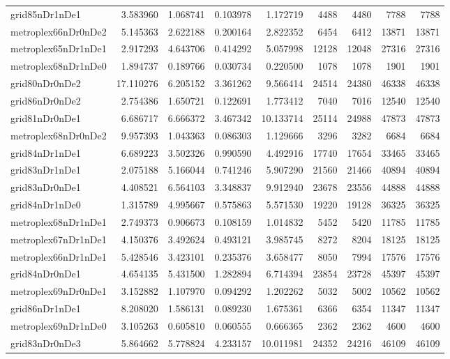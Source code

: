 \begin{longtable}{|l|r|r|r|r|r|r|r|r|}
grid85nDr1nDe1 & 3.583960 & 1.068741 & 0.103978 & 1.172719 & 4488 & 4480 & 7788 & 7788 \\
metroplex66nDr0nDe2 & 5.145363 & 2.622188 & 0.200164 & 2.822352 & 6454 & 6412 & 13871 & 13871 \\
metroplex65nDr1nDe1 & 2.917293 & 4.643706 & 0.414292 & 5.057998 & 12128 & 12048 & 27316 & 27316 \\
metroplex68nDr1nDe0 & 1.894737 & 0.189766 & 0.030734 & 0.220500 & 1078 & 1078 & 1901 & 1901 \\
grid80nDr0nDe2 & 17.110276 & 6.205152 & 3.361262 & 9.566414 & 24514 & 24380 & 46338 & 46338 \\
grid86nDr0nDe2 & 2.754386 & 1.650721 & 0.122691 & 1.773412 & 7040 & 7016 & 12540 & 12540 \\
grid81nDr0nDe1 & 6.686717 & 6.666372 & 3.467342 & 10.133714 & 25114 & 24988 & 47873 & 47873 \\
metroplex68nDr0nDe2 & 9.957393 & 1.043363 & 0.086303 & 1.129666 & 3296 & 3282 & 6684 & 6684 \\
grid84nDr1nDe1 & 6.689223 & 3.502326 & 0.990590 & 4.492916 & 17740 & 17654 & 33465 & 33465 \\
grid83nDr1nDe1 & 2.075188 & 5.166044 & 0.741246 & 5.907290 & 21560 & 21466 & 40894 & 40894 \\
grid83nDr0nDe1 & 4.408521 & 6.564103 & 3.348837 & 9.912940 & 23678 & 23556 & 44888 & 44888 \\
grid84nDr1nDe0 & 1.315789 & 4.995667 & 0.575863 & 5.571530 & 19220 & 19128 & 36325 & 36325 \\
metroplex68nDr1nDe1 & 2.749373 & 0.906673 & 0.108159 & 1.014832 & 5452 & 5420 & 11785 & 11785 \\
metroplex67nDr1nDe1 & 4.150376 & 3.492624 & 0.493121 & 3.985745 & 8272 & 8204 & 18125 & 18125 \\
metroplex66nDr1nDe1 & 5.428546 & 3.423101 & 0.235376 & 3.658477 & 8050 & 7994 & 17576 & 17576 \\
grid84nDr0nDe1 & 4.654135 & 5.431500 & 1.282894 & 6.714394 & 23854 & 23728 & 45397 & 45397 \\
metroplex69nDr0nDe1 & 3.152882 & 1.107970 & 0.094292 & 1.202262 & 5032 & 5002 & 10562 & 10562 \\
grid86nDr1nDe1 & 8.208020 & 1.586131 & 0.089230 & 1.675361 & 6366 & 6354 & 11347 & 11347 \\
metroplex69nDr1nDe0 & 3.105263 & 0.605810 & 0.060555 & 0.666365 & 2362 & 2362 & 4600 & 4600 \\
grid83nDr0nDe3 & 5.864662 & 5.778824 & 4.233157 & 10.011981 & 24352 & 24216 & 46109 & 46109 \\

\end{longtable}
